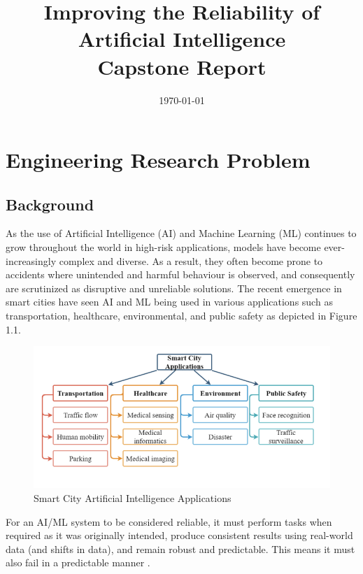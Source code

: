 \documentclass[a4paper,12pt]{report}
\title{\Huge{\textbf{Improving the Reliability of Artificial Intelligence}}\\
\vspace*{0.3cm}
\Large{Capstone Report}}
\date{\today}
\begin{document}
\maketitle
\tableofcontents
    \thispagestyle{empty}
\listoffigures
    \thispagestyle{empty}
\listoftables
    \thispagestyle{empty}


\chapter{Engineering Research Problem}
\setcounter{page}{1}
\label{chap:chap1}

\section{Background }
As the use of Artificial Intelligence (AI) and Machine 
Learning (ML) continues to grow throughout the world 
in high-risk applications, models have become 
ever-increasingly complex and diverse. As a result, 
they often become prone to accidents where unintended 
and harmful behaviour is observed, and consequently are 
scrutinized as disruptive and unreliable solutions. The 
recent emergence in smart cities have seen AI and ML being 
used in various applications such as transportation, 
healthcare, environmental, and public safety as depicted in Figure 1.1.

\begin{figure}[h]
    \includegraphics{smart_city_applications.png}
    \caption{Smart City Artificial Intelligence Applications \cite{chen}}
    \label{fig:smart}
\end{figure}

\enlargethispage{2\baselineskip}
For an AI/ML system to be considered reliable, it must 
perform tasks when required as it was originally 
intended, produce consistent results using real-world 
data (and shifts in data), and remain robust and 
predictable. This means it must also fail in a 
predictable manner \cite{Saif}. 
\end{document}
